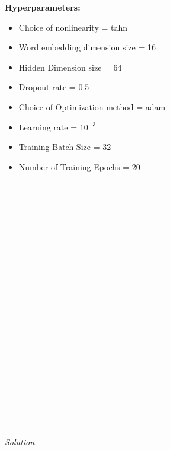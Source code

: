 \documentclass[12pt]{article}
\newcommand\sol[1]{\begin{mdframed}
\emph{Solution.} #1
\end{mdframed}}
\begin{document}
\textbf{Hyperparameters:}
\begin{itemize}
    \item Choice of nonlinearity = tahn
    \item Word embedding dimension size = 16
    \item Hidden Dimension size = 64
    \item Dropout rate = 0.5 
    \item Choice of Optimization method = adam
    \item Learning rate = $10^{-3}$
    \item Training Batch Size = 32
    \item Number of Training Epochs = 20\\\\\\\\\\\\\\\\\\\\\\\\\\\\\\\\\\\\\\\\\\\\\\
    
\end{itemize}

\sol {
}
\end{document}
